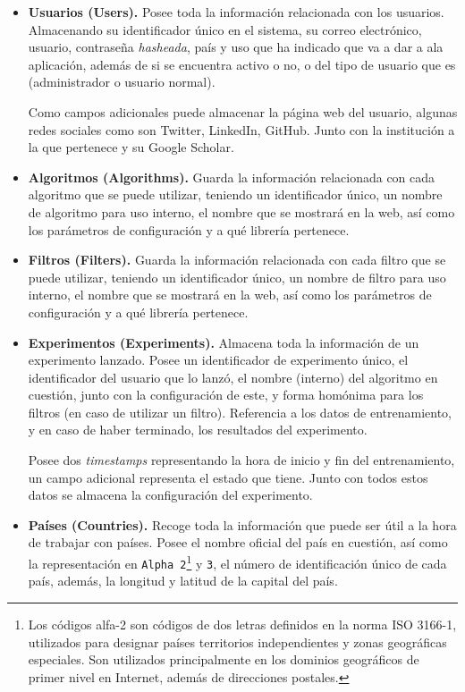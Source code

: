 \begin{itemize}
\item \textbf{Usuarios (Users).} Posee toda la información relacionada con los usuarios. Almacenando su identificador único en el sistema, su correo electrónico, usuario, contraseña \textit{hasheada}, país y uso que ha indicado que va a dar a ala aplicación, además de si se encuentra activo o no, o del tipo de usuario que es (administrador o usuario normal). 

Como campos adicionales puede almacenar la página web del usuario, algunas redes sociales como son Twitter, LinkedIn, GitHub. Junto con la institución a la que pertenece y su Google Scholar.

\item \textbf{Algoritmos (Algorithms).} Guarda la información relacionada con cada algoritmo que se puede utilizar, teniendo un identificador único, un nombre de algoritmo para uso interno, el nombre que se mostrará en la web, así como los parámetros de configuración y a qué librería pertenece.

\item \textbf{Filtros (Filters).} Guarda la información relacionada con cada filtro que se puede utilizar, teniendo un identificador único, un nombre de filtro para uso interno, el nombre que se mostrará en la web, así como los parámetros de configuración y a qué librería pertenece.

\item \textbf{Experimentos (Experiments).} Almacena toda la información de un experimento lanzado. Posee un identificador de experimento único, el identificador del usuario que lo lanzó, el nombre (interno) del algoritmo en cuestión, junto con la configuración de este, y forma homónima para los filtros (en caso de utilizar un filtro).  Referencia a los datos de entrenamiento, y en caso de haber terminado, los resultados del experimento. 

Posee dos \textit{timestamps} representando la hora de inicio y fin del entrenamiento, un campo adicional representa el estado que tiene. Junto con todos estos datos se almacena la configuración del experimento.

\item \textbf{Países (Countries).} Recoge toda la información que puede ser útil a la hora de trabajar con países. Posee el nombre oficial del país en cuestión, así como la representación en \texttt{Alpha 2}\footnote{Los códigos alfa-2 son códigos de dos letras definidos en la norma ISO 3166-1, utilizados para designar países territorios independientes y zonas geográficas especiales. Son utilizados principalmente en los dominios geográficos de primer nivel en Internet, además de direcciones postales.} y \texttt{3}, el número de identificación único de cada país, además, la longitud y latitud de la capital del país. 
\end{itemize}


